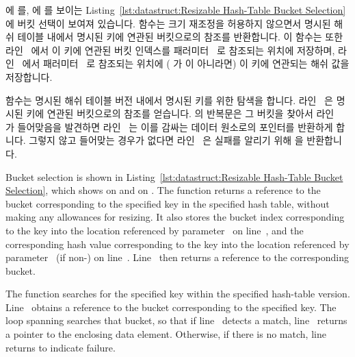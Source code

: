 \begin{fcvref}
 에  를,
 에  를 보이는
Listing~\ref{lst:datastruct:Resizable Hash-Table Bucket Selection} 에 버킷
선택이 보여져 있습니다.
 함수는 크기 재조정을 허용하지 않으면서 명시된 해쉬 테이블
내에서 명시된 키에 연관된 버킷으로의 참조를 반환합니다.
이 함수는 또한 라인~ 에서 이 키에 연관된 버킷 인덱스를
패러미터~ 로 참조되는 위치에 저장하며, 라인~ 에서
패러미터~ 로 참조되는 위치에 ( 가  이 아니라면) 이 키에
연관되는 해쉬 값을 저장합니다.

 함수는 명시된 해쉬 테이블 버전 내에서 명시된 키를 위한
탐색을 합니다.
라인~ 은 명시된 키에 연관된 버킷으로의 참조를 얻습니다.
 의 반복문은 그 버킷을 찾아서
라인~ 가 들어맞음을 발견하면 라인~ 는
이를 감싸는 데이터 원소로의 포인터를 반환하게 합니다.
그렇지 않고 들어맞는 경우가 없다면 라인~ 은 실패를 알리기
위해  을 반환합니다.
\end{fcvref}

\iffalse

\begin{fcvref}
Bucket selection is shown in
Listing~\ref{lst:datastruct:Resizable Hash-Table Bucket Selection},
which shows  on
 and  on
.
The  function returns a reference to the bucket
corresponding to the specified key in the specified hash table, without
making any allowances for resizing.
It also stores the bucket index corresponding to the key into the location
referenced by parameter~ on
line~, and the corresponding
hash value corresponding to the key into the location
referenced by parameter~ (if non-) on line~.
Line~ then returns a reference to the corresponding bucket.

The  function searches for the specified key
within the specified hash-table version.
Line~ obtains a reference to the bucket corresponding
to the specified key.
The loop spanning  searches
that bucket, so that if line~ detects a match,
line~ returns a pointer to the enclosing data element.
Otherwise, if there is no match,
line~ returns  to indicate
failure.
\end{fcvref}

